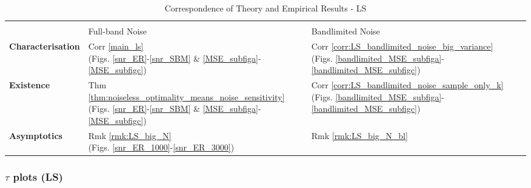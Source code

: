 \begin{table}[h]
\caption{Correspondence of Theory and Empirical Results - LS}
\centering
\begin{tabularx}{\textwidth}{l >{\centering\arraybackslash}p{15em} >{\centering\arraybackslash}X}
\toprule
& \multicolumn{2}{c}{\textbf{LS}} \\
\cmidrule(lr){2-3}
 & Full-band Noise & Bandlimited Noise \\
\midrule
\textbf{Characterisation} & 
\makecell[c]{Corr \ref{main_ls} \\
(Figs. \ref{snr_ER}-\ref{snr_SBM} 
\& \ref{MSE_subfiga}-\ref{MSE_subfigc})} & 
\makecell[c]{Corr \ref{corr:LS_bandlimited_noise_big_variance} \\ (Figs. \ref{bandlimited_MSE_subfiga}- \ref{bandlimited_MSE_subfigc})} \\
\midrule
\textbf{Existence} & 
\makecell[c]{Thm \ref{thm:noiseless_optimality_means_noise_sensitivity} \\ (Figs. \ref{snr_ER}-\ref{snr_SBM}
\& \ref{MSE_subfiga}-\ref{MSE_subfigc})} & 
\makecell[c]{Corr \ref{corr:LS_bandlimited_noise_sample_only_k} \\ (Figs. \ref{bandlimited_MSE_subfiga}- \ref{bandlimited_MSE_subfigc})} \\
\midrule
\textbf{Asymptotics} & 
\makecell[c]{Rmk \ref{rmk:LS_big_N} \\ (Figs. \ref{snr_ER_1000}-\ref{snr_ER_3000})} & 
\makecell[c]{Rmk \ref{rmk:LS_big_N_bl}\\} \\
\bottomrule
\end{tabularx}
\label{tbl:theory_experiment_correspondence_LS}
\end{table}



\subsubsection{$\tau$ plots (LS)}



